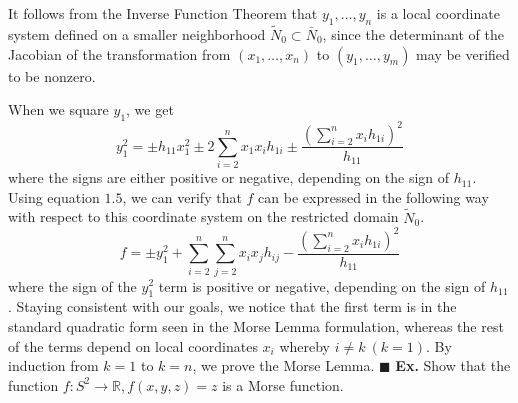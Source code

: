 \documentclass[]{article}
\newcommand{\R}{\mathbb{R}}
\begin{document}
     It follows from the Inverse Function Theorem that $y_1,\ldots,y_n$ is a local
     coordinate system defined on a smaller neighborhood $\tilde{N}_0 \subset \bar{N}_0$,
     since the determinant of the Jacobian of the transformation from $(x_1, \ldots,x_n)$
     to $(y_1,\ldots,y_m)$ may be verified to be nonzero.

     When we square $y_1$, we get
     \begin{equation}
        y_1^2=\pm h_{11}x_1^2\pm2\sum_{i=2}^{n}{x_1x_ih_{1i}}\pm\frac{\left(\sum_{i=2}^{n}{x_ih_{1i}}\right)^2}{h_{11}}\tag{1.9}
     \end{equation}
     where the signs are either positive or negative, depending on the sign of $h_{11}$. Using equation
     $1.5$, we can verify that $f$ can be expressed in the following way with respect to this
     coordinate system on the restricted domain $\tilde{N}_0$.
     \begin{equation}
        f=\pm y_1^2 + \sum_{i=2}^{n}\sum_{j=2}^{n}{x_ix_jh_{ij}}-\frac{\left(\sum_{i=2}^{n}{x_ih_{1i}}\right)^2}{h_{11}}\tag{1.10}
     \end{equation}
     where the sign of the $y_1^2$ term is positive or negative, depending on the sign of $h_{11}$. Staying
     consistent with our goals, we notice that the first term is in the standard quadratic form seen
     in the Morse Lemma formulation, whereas the rest of the terms depend on local coordinates
     $x_i$ whereby $i\not=k \ (k=1)$. By induction from $k=1$ to $k=n$, we prove the Morse Lemma. $\blacksquare$
\textbf{Ex.} Show that the function $f: S^2 \to \R, f(x,y,z) = z$ is a Morse function. \\
\end{document}
